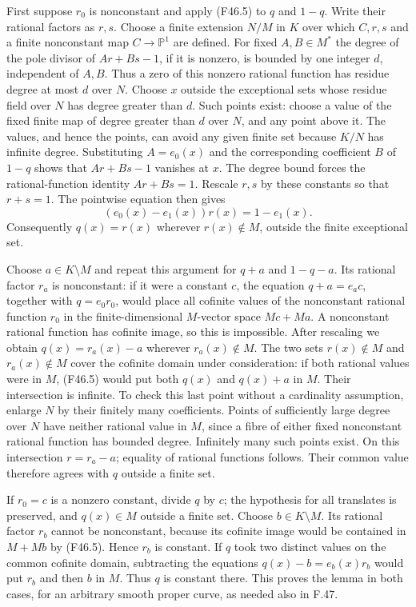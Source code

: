First suppose $r_0$ is nonconstant and apply (F46.5) to $q$ and
$1-q$. Write their rational factors as $r,s$. Choose a finite
extension $N/M$ in $K$ over which $C,r,s$ and a finite nonconstant
map $C\to\mathbb P^1$ are defined. For fixed $A,B\in M^*$ the
degree of the pole divisor of $Ar+Bs-1$, if it is nonzero, is
bounded by one integer $d$, independent of $A,B$. Thus a zero
of this nonzero rational function has residue degree at most $d$
over $N$. Choose $x$ outside the exceptional sets whose residue
field over $N$ has degree greater than $d$. Such points exist:
choose a value of the fixed finite map of degree greater than
$d$ over $N$, and any point above it. The values, and hence the
points, can avoid any given finite set because $K/N$ has infinite
degree. Substituting $A=e_0(x)$ and the corresponding coefficient
$B$ of $1-q$ shows that $Ar+Bs-1$ vanishes at $x$.
The degree bound forces the rational-function identity $Ar+Bs=1$.
Rescale $r,s$ by these constants so that $r+s=1$.
The pointwise equation then gives
\[
 (e_0(x)-e_1(x))r(x)=1-e_1(x).
\]
Consequently $q(x)=r(x)$ wherever $r(x)\notin M$, outside the
finite exceptional set.

Choose $a\in K\setminus M$ and repeat this argument for
$q+a$ and $1-q-a$. Its rational factor $r_a$ is nonconstant:
if it were a constant $c$, the equation
$q+a=e_a c$, together with $q=e_0r_0$, would place all cofinite
values of the nonconstant rational function $r_0$ in the
finite-dimensional $M$-vector space $Mc+Ma$. A nonconstant
rational function has cofinite image, so this is impossible.
After rescaling we obtain $q(x)=r_a(x)-a$ wherever
$r_a(x)\notin M$.
The two sets $r(x)\notin M$ and $r_a(x)\notin M$ cover the
cofinite domain under consideration: if both rational values were
in $M$, (F46.5) would put both $q(x)$ and $q(x)+a$ in $M$.
Their intersection is infinite. To check this last point without
a cardinality assumption, enlarge $N$ by their finitely many
coefficients. Points of sufficiently large degree over $N$ have
neither rational value in $M$, since a fibre of either fixed
nonconstant rational function has bounded degree. Infinitely many
such points exist. On this intersection $r=r_a-a$; equality of
rational functions follows. Their common value therefore agrees
with $q$ outside a finite set.

If $r_0=c$ is a nonzero constant, divide $q$ by $c$; the hypothesis
for all translates is preserved, and $q(x)\in M$ outside a finite
set. Choose $b\in K\setminus M$. Its rational factor $r_b$ cannot
be nonconstant, because its cofinite image would be contained in
$M+Mb$ by (F46.5). Hence $r_b$ is constant. If $q$ took two distinct
values on the common cofinite domain, subtracting the equations
$q(x)-b=e_b(x)r_b$ would put $r_b$ and then $b$ in $M$.
Thus $q$ is constant there. This proves the lemma in both cases,
for an arbitrary smooth proper curve, as needed also in F.47.

